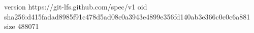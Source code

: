 version https://git-lfs.github.com/spec/v1
oid sha256:d415fadad8985f91c478d5ad08c0a3943e4899e356fd140ab3e366c0c0c6a881
size 488071
